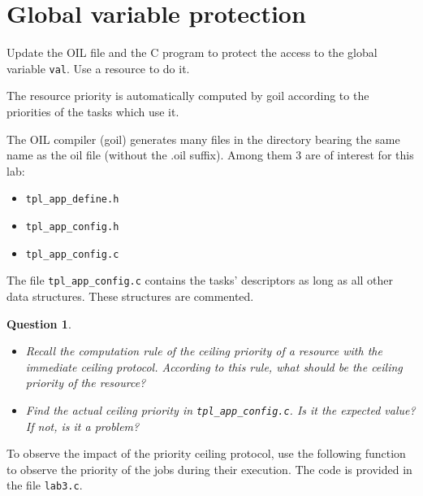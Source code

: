 \documentclass[11pt]{report}
\newtheorem{ex}{Question}
\newcommand{\unixcl}[1]{\texttt{\fcolorbox{black}{gray!20}{\footnotesize#1}}}
\begin{document}



\section{Global variable protection}


Update the OIL file and the C program to protect the access to the global variable \texttt{val}. Use a resource to do it.

The resource priority is automatically computed by goil according to the priorities of the tasks which use it.

The OIL compiler (goil) generates many files in the directory bearing the same name
as the oil file (without the .oil suffix). Among them 3 are of interest for this lab:
\begin{itemize}
\item \texttt{tpl_app_define.h}
\item \texttt{tpl_app_config.h}
\item \texttt{tpl_app_config.c}
\end{itemize}

The file \texttt{tpl_app_config.c} contains the tasks' descriptors as long as all other data structures. These structures are commented.

\begin{ex} ~
    \begin{itemize}
        \item
            Recall the computation rule of the ceiling priority of a resource with the immediate ceiling protocol.
            According to this rule, what should be the ceiling priority of the resource?
        \item
            Find the actual ceiling priority in \texttt{tpl_app_config.c}. Is it the expected value? If not, is it a problem?
    \end{itemize}
\end{ex}

To observe the impact of the priority ceiling protocol, use the following function to observe the priority of the jobs during their execution. The code is provided in the file \texttt{lab3.c}.
\end{document}
